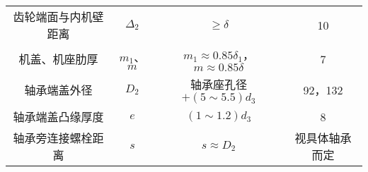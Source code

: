 \begin{table}[H]
\begin{center}
\begin{tabular}{cccc}
			齿轮端面与内机壁距离 & $\Delta_2$ & $\geq \delta$ & 10\\
			机盖、机座肋厚 & $m_1$、$m$ & $m_1\approx0.85\delta_1$，$m\approx0.85\delta$ &7\\
			轴承端盖外径 & $D_2$ & 轴承座孔径$+(5\sim 5.5)d_3$ & 92，132\\
			轴承端盖凸缘厚度 & $e$ & $\left(1\sim 1.2\right)d_3$ & 8 \\
			轴承旁连接螺栓距离 & $s$ & $s\approx D_2$ & 视具体轴承而定\\
			\bottomrule
		\end{tabular}
	\end{center}
\end{table}